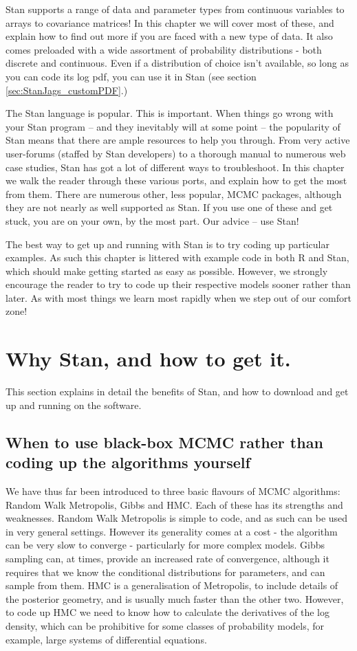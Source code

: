 \documentclass[11pt,fullpage]{book}
\begin{document}
Stan supports a range of data and parameter types from continuous variables to arrays to covariance matrices! In this chapter we will cover most of these, and explain how to find out more if you are faced with a new type of data. It also comes preloaded with a wide assortment of probability distributions - both discrete and continuous. Even if a distribution of choice isn't available, so long as you can code its log pdf, you can use it in Stan (see section \ref{sec:StanJags_customPDF}.)

The Stan language is popular. This is important. When things go wrong with your Stan program -- and they inevitably will at some point -- the popularity of Stan means that there are ample resources to help you through. From very active user-forums (staffed by Stan developers) to a thorough manual to numerous web case studies, Stan has got a lot of different ways to troubleshoot. In this chapter we walk the reader through these various ports, and explain how to get the most from them. There are numerous other, less popular, MCMC packages, although they are not nearly as well supported as Stan. If you use one of these and get stuck, you are on your own, by the most part. Our advice -- use Stan!

The best way to get up and running with Stan is to try coding up particular examples. As such this chapter is littered with example code in both R and Stan, which should make getting started as easy as possible. However, we strongly encourage the reader to try to code up their respective models sooner rather than later. As with most things we learn most rapidly when we step out of our comfort zone!

\section{Why Stan, and how to get it.}
This section explains in detail the benefits of Stan, and how to download and get up and running on the software.

\subsection{When to use black-box MCMC rather than coding up the algorithms yourself}
We have thus far been introduced to three basic flavours of MCMC algorithms: Random Walk Metropolis, Gibbs and HMC. Each of these has its strengths and weaknesses. Random Walk Metropolis is simple to code, and as such can be used in very general settings. However its generality comes at a cost - the algorithm can be very slow to converge - particularly for more complex models. Gibbs sampling can, at times, provide an increased rate of convergence, although it requires that we know the conditional distributions for parameters, and can sample from them. HMC is a generalisation of Metropolis, to include details of the posterior geometry, and is usually much faster than the other two. However, to code up HMC we need to know how to calculate the derivatives of the log density, which can be prohibitive for some classes of probability models, for example, large systems of differential equations.
\end{document}
